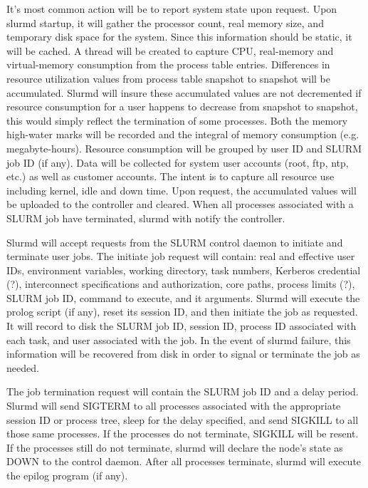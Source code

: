 It's most common action will be to report system state upon 
request. Upon slurmd startup, it will gather the processor 
count, real memory size, and temporary disk space for the 
system. Since this information should be static, it will be 
cached. A thread will be created to capture CPU, real-memory 
and virtual-memory consumption from the process table entries. 
Differences in resource utilization values from process table 
snapshot to snapshot will be accumulated. Slurmd will 
insure these accumulated values are not decremented if resource 
consumption for a user happens to decrease from snapshot to 
snapshot, this would simply reflect the termination of some 
processes.
Both the memory high-water marks will be recorded and the 
integral of memory consumption (e.g. megabyte-hours).
Resource consumption will be grouped by user ID and 
SLURM job ID (if any). Data will be collected for 
system user accounts (root, ftp, ntp, etc.) as well as 
customer accounts. The intent is to capture all resource 
use including kernel, idle and down time. 
Upon request, the accumulated values will be uploaded to 
the controller and cleared. 
When all processes associated with a SLURM job have terminated, 
slurmd with notify the controller. 

Slurmd will accept requests from the SLURM control daemon 
to initiate and terminate user jobs. The initiate 
job request will contain: real and effective user IDs, 
environment variables, working directory, task numbers, 
Kerberos credential (?), interconnect specifications 
and authorization, core paths, process limits (?), SLURM job ID,
command to execute, and it arguments. Slurmd will 
execute the prolog script (if any), reset its session
ID, and then initiate the job as requested. It will 
record to disk the SLURM job ID, session ID, process ID associated 
with each task, and user associated with the job. 
In the event of slurmd failure, this information will 
be recovered from disk in order to signal or terminate 
the job as needed.


The job termination request will contain the SLURM job ID and 
a delay period. Slurmd will send SIGTERM to all processes associated 
with the appropriate session ID or process tree, sleep for the 
delay specified, and send SIGKILL to all those same processes. 
If the processes do not terminate, SIGKILL will be resent. 
If the processes still do not terminate, slurmd will declare 
the node's state as DOWN to the control daemon. After all 
processes terminate, slurmd will execute the epilog program 
(if any). 

